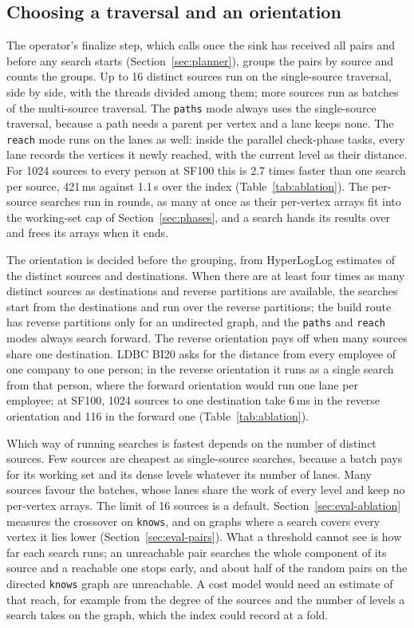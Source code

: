 \subsection{Choosing a traversal and an orientation}
\label{sec:choice}

The operator's finalize step, which \duckdb calls once the sink has received all pairs and before any search
starts (Section~\ref{sec:planner}), groups the pairs by source and counts the groups. Up to 16 distinct sources run
on the single-source traversal, side by side, with the threads divided among them; more sources run as batches of the
multi-source traversal. The \texttt{paths} mode always uses the single-source traversal, because a path needs a
parent per vertex and a lane keeps none. The \texttt{reach} mode runs on the lanes as well: inside the parallel check-phase tasks, every lane records the
vertices it newly reached, with the current level as their distance. For 1024 sources to every person at SF100 this is 2.7 times faster than one search per source, 421\,ms against 1.1\,s over the index (Table~\ref{tab:ablation}). The per-source searches run in rounds, as many at once as their per-vertex arrays fit into the working-set cap
of Section~\ref{sec:phases}, and a search hands its results over and frees its arrays when it ends.

The orientation is decided before the grouping, from HyperLogLog estimates of the distinct sources and
destinations. When there are at least four times as many distinct sources as destinations and reverse partitions
are available, the searches start from the destinations and run over the reverse partitions; the build route has
reverse partitions only for an undirected graph, and the \texttt{paths} and \texttt{reach} modes always search
forward. The reverse orientation pays off when many sources share one destination. LDBC BI20 asks for the
distance from every employee of one company to one person; in the reverse orientation it runs as a single search from
that person, where the forward orientation would run one lane per employee; at SF100, 1024 sources to one destination take 6\,ms in the reverse orientation and 116 in the forward one (Table~\ref{tab:ablation}).

Which way of running searches is fastest depends on the number of distinct sources. Few sources are cheapest as
single-source searches, because a batch pays for its working set and its dense levels whatever its number of lanes.
Many sources favour the batches, whose lanes share the work of every level and keep no per-vertex arrays.
The limit of 16 sources is a default. Section~\ref{sec:eval-ablation} measures the crossover on \texttt{knows},
and on graphs where a search covers every vertex it lies lower (Section~\ref{sec:eval-pairs}). What a threshold cannot
see is how far each search runs; an unreachable pair searches the whole component of its source and a reachable one
stops early, and about half of the random pairs on the directed \texttt{knows} graph are unreachable. A cost model
would need an estimate of that reach, for example from the degree of the sources and the number of levels a search
takes on the graph, which the index could record at a fold.

